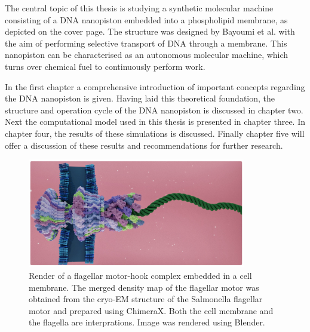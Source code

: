 The central topic of this thesis is studying a synthetic molecular machine consisting of
a DNA nanopiston embedded into a phospholipid membrane, as depicted on the cover page.
The structure was designed by Bayoumi et al. with the aim of performing
selective transport of DNA through a membrane.\cite{Bayoumi21} This
nanopiston can be characterised as an autonomous molecular machine, which turns over
chemical fuel to continuously perform work.


In the first chapter a comprehensive introduction of important concepts
regarding the DNA nanopiston is given. Having laid this theoretical foundation, the
structure and operation cycle of the DNA nanopiston is discussed in chapter two. Next the
computational model used in this thesis is presented in chapter three. In chapter four,
the results of these simulations is discussed. Finally chapter five will offer a
discussion of these results and recommendations for further research.
\vspace{0.5cm}
\begin{figure}[ht!]
\begin{center}
  \includegraphics[width=0.85\textwidth]{Figures/flagella2.png}
  \caption[Render of a flagellar motor-hook complex, based on the cryo-EM structure of
  the Salmonella flagellar motor.] {Render of a flagellar motor-hook complex embedded in
  a
  cell membrane. The merged density map of the flagellar motor was obtained from the
  cryo-EM structure of the Salmonella flagellar motor and
  prepared using
  ChimeraX.  Both the cell membrane and the flagella are interprations. Image was
rendered using Blender.\cite{Tan2021, blender,
ChimeraX}}
  \label{fig:flagella}
\end{center}
\end{figure}

